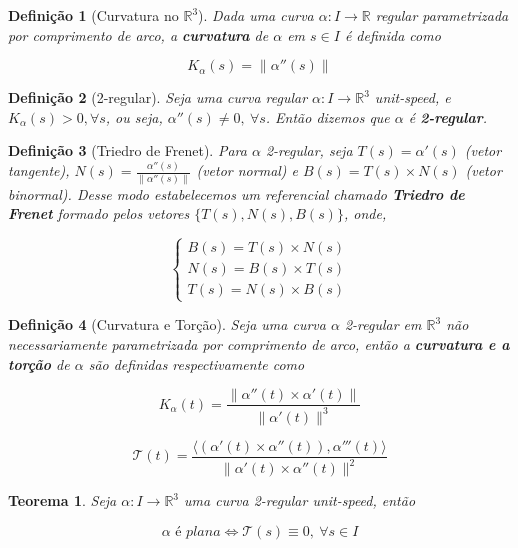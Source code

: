 \documentclass{article}
\newtheorem{theorem}{Teorema}
\newtheorem{definition}{Definição}
\begin{document}
\begin{definition}[Curvatura no $\mathbb{R}^3$]
Dada uma curva $\alpha: I \rightarrow \mathbb{R}$ regular parametrizada por comprimento de arco, a \textbf{curvatura} de $\alpha$ em $s \in I$ é definida como

$$K_\alpha(s) = \| \alpha''(s) \|$$
\end{definition}

\begin{definition}[2-regular]
Seja uma curva regular $\alpha: I \rightarrow \mathbb{R}^3$ \textit{unit-speed}, e $K_\alpha(s) > 0, \forall s$, ou seja, $\alpha''(s) \neq 0,\ \forall s$. Então dizemos que $\alpha$ é \textbf{2-regular}.
\end{definition}

\begin{definition}[Triedro de Frenet]
Para $\alpha$ 2-regular, seja $T(s) = \alpha'(s)$ (vetor tangente), $N(s) = \frac{\alpha''(s)}{\| \alpha''(s) \|}$ (vetor normal) e $B(s) = T(s) \times N(s)$ (vetor binormal). Desse modo estabelecemos um referencial chamado \textbf{Triedro de Frenet} formado pelos vetores $\{ T(s), N(s), B(s) \}$, onde,

$$ \left \{
\begin{array}{lll}
    B(s) = T(s) \times N(s) \\
    N(s) = B(s) \times T(s) \\
    T(s) = N(s) \times B(s)
\end{array} \right .
$$
\end{definition}

\begin{definition}[Curvatura e Torção]
Seja uma curva $\alpha$ 2-regular em $\mathbb{R}^3$ não necessariamente parametrizada por comprimento de arco, então a \textbf{curvatura e a torção} de $\alpha$ são definidas respectivamente como

$$K_\alpha(t) = \frac{\| \alpha''(t) \times \alpha'(t) \|}{\| \alpha'(t) \|^3}$$

$$\mathcal{T}(t) = \frac{\langle (\alpha'(t) \times \alpha''(t)), \alpha'''(t) \rangle}{\| \alpha'(t) \times \alpha''(t) \|^2}$$
\end{definition}

\begin{theorem}
Seja $\alpha: I \rightarrow \mathbb{R}^3$ uma curva 2-regular \textit{unit-speed}, então

$$\alpha \textit{ é plana} \Longleftrightarrow \mathcal{T}(s) \equiv 0,\ \forall s \in I$$
\end{theorem}
\end{document}
